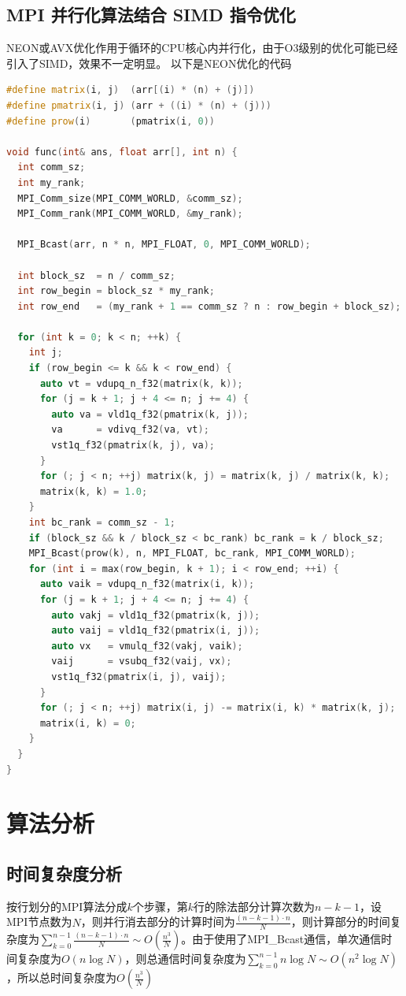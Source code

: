 \documentclass[a4paper]{article}
\begin{document}
\subsection{MPI 并行化算法结合 SIMD 指令优化}
NEON或AVX优化作用于循环的CPU核心内并行化，由于O3级别的优化可能已经引入了SIMD，效果不一定明显。
以下是NEON优化的代码
\begin{lstlisting}[frame=trbl,language={C++}]
#define matrix(i, j)  (arr[(i) * (n) + (j)])
#define pmatrix(i, j) (arr + ((i) * (n) + (j)))
#define prow(i)       (pmatrix(i, 0))

void func(int& ans, float arr[], int n) {
  int comm_sz;
  int my_rank;
  MPI_Comm_size(MPI_COMM_WORLD, &comm_sz);
  MPI_Comm_rank(MPI_COMM_WORLD, &my_rank);

  MPI_Bcast(arr, n * n, MPI_FLOAT, 0, MPI_COMM_WORLD);

  int block_sz  = n / comm_sz;
  int row_begin = block_sz * my_rank;
  int row_end   = (my_rank + 1 == comm_sz ? n : row_begin + block_sz);

  for (int k = 0; k < n; ++k) {
    int j;
    if (row_begin <= k && k < row_end) {
      auto vt = vdupq_n_f32(matrix(k, k));
      for (j = k + 1; j + 4 <= n; j += 4) {
        auto va = vld1q_f32(pmatrix(k, j));
        va      = vdivq_f32(va, vt);
        vst1q_f32(pmatrix(k, j), va);
      }
      for (; j < n; ++j) matrix(k, j) = matrix(k, j) / matrix(k, k);
      matrix(k, k) = 1.0;
    }
    int bc_rank = comm_sz - 1;
    if (block_sz && k / block_sz < bc_rank) bc_rank = k / block_sz;
    MPI_Bcast(prow(k), n, MPI_FLOAT, bc_rank, MPI_COMM_WORLD);
    for (int i = max(row_begin, k + 1); i < row_end; ++i) {
      auto vaik = vdupq_n_f32(matrix(i, k));
      for (j = k + 1; j + 4 <= n; j += 4) {
        auto vakj = vld1q_f32(pmatrix(k, j));
        auto vaij = vld1q_f32(pmatrix(i, j));
        auto vx   = vmulq_f32(vakj, vaik);
        vaij      = vsubq_f32(vaij, vx);
        vst1q_f32(pmatrix(i, j), vaij);
      }
      for (; j < n; ++j) matrix(i, j) -= matrix(i, k) * matrix(k, j);
      matrix(i, k) = 0;
    }
  }
}
\end{lstlisting}

\section{算法分析}
\subsection{时间复杂度分析}
按行划分的MPI算法分成$k$个步骤，第$k$行的除法部分计算次数为$n-k-1$，设MPI节点数为$N$，则并行消去部分的计算时间为$\frac{(n-k-1) \cdot n}{N}$，则计算部分的时间复杂度为$\sum_{k=0}^{n-1}\frac{(n-k-1) \cdot n}{N} \sim O(\frac{n^3}{N})$。由于使用了MPI\_Bcast通信，单次通信时间复杂度为$O(n\log{N})$，则总通信时间复杂度为$\sum_{k=0}^{n-1}n\log{N} \sim O(n^2\log{N})$，所以总时间复杂度为$O(\frac{n^3}{N})$
\end{document}
